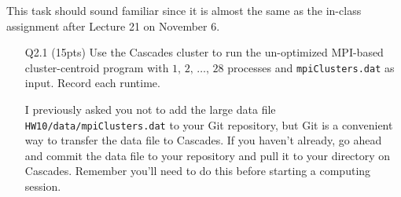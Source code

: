 This task should sound familiar since it is almost the same as the in-class assignment after Lecture 21 on November 6.
\begin{itemize}
    \item[Q2.1] (15pts) Use the Cascades cluster to run the un-optimized MPI-based cluster-centroid program with $1,\,2,\,\dots,\,28$ processes and \texttt{mpiClusters.dat} as input.
    Record each runtime.
    
    I previously asked you not to add the large data file \texttt{HW10/data/mpiClusters.dat} to your Git repository,
    but Git is a convenient way to transfer the data file to Cascades.
    If you haven't already, go ahead and commit the data file to your repository and pull it to your directory on Cascades.
    Remember you'll need to do this before starting a computing session.
    

\end{itemize}
